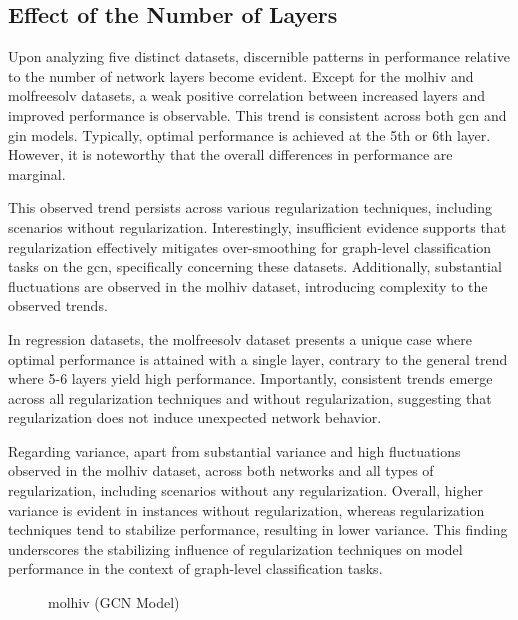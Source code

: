 \subsection{Effect of the Number of Layers}

Upon analyzing five distinct datasets, discernible patterns in performance relative to the number of network layers become evident. Except for the molhiv and molfreesolv datasets, a weak positive correlation between increased layers and improved performance is observable. This trend is consistent across both \ac{gcn} and \ac{gin} models. Typically, optimal performance is achieved at the 5th or 6th layer. However, it is noteworthy that the overall differences in performance are marginal.

This observed trend persists across various regularization techniques, including scenarios without regularization. Interestingly, insufficient evidence supports that regularization effectively mitigates over-smoothing for graph-level classification tasks on the \ac{gcn}, specifically concerning these datasets. Additionally, substantial fluctuations are observed in the molhiv dataset, introducing complexity to the observed trends.

In regression datasets, the molfreesolv dataset presents a unique case where optimal performance is attained with a single layer, contrary to the general trend where 5-6 layers yield high performance. Importantly, consistent trends emerge across all regularization techniques and without regularization, suggesting that regularization does not induce unexpected network behavior.

Regarding variance, apart from substantial variance and high fluctuations observed in the molhiv dataset, across both networks and all types of regularization, including scenarios without any regularization. Overall, higher variance is evident in instances without regularization, whereas regularization techniques tend to stabilize performance, resulting in lower variance. This finding underscores the stabilizing influence of regularization techniques on model performance in the context of graph-level classification tasks.

\begin{figure}
    \centering
    \caption{molhiv (GCN Model)}
    \label{fig:gcn-molfreesolv}
\end{figure}

